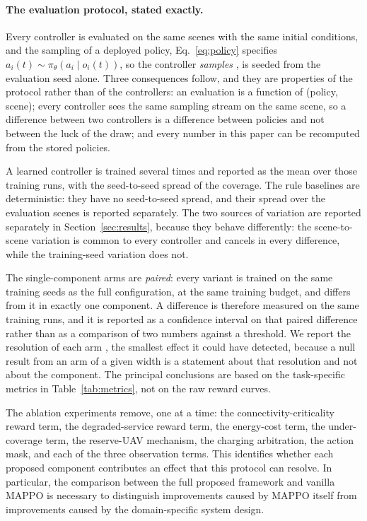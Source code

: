 \documentclass[conference]{IEEEtran}
\begin{document}
\paragraph{The evaluation protocol, stated exactly.} Every controller is
evaluated on the same scenes with the same initial conditions, and the
sampling of a deployed policy, Eq.~\eqref{eq:policy} specifies
$a_i(t)\sim\pi_\theta(a_i\mid o_i(t))$, so the controller \emph{samples} , 
is seeded from the evaluation seed alone. Three consequences follow, and
they are properties of the protocol rather than of the controllers: an
evaluation is a function of (policy, scene); every controller sees the
same sampling stream on the same scene, so a difference between two
controllers is a difference between policies and not between the luck of
the draw; and every number in this paper can be recomputed from the
stored policies.

A learned controller is trained several times and reported as the mean
over those training runs, with the seed-to-seed spread of the coverage.
The rule baselines are deterministic: they have no seed-to-seed spread,
and their spread over the evaluation scenes is reported separately. The
two sources of variation are reported separately in
Section~\ref{sec:results}, because they behave differently: the
scene-to-scene variation is common to every controller and cancels in
every difference, while the training-seed variation does not.

The single-component arms are \emph{paired}: every variant is trained on
the same training seeds as the full configuration, at the same training
budget, and differs from it in exactly one component. A difference is
therefore measured on the same training runs, and it is reported as a
confidence interval on that paired difference rather than as a comparison
of two numbers against a threshold. We report the resolution of each arm
,  the smallest effect it could have detected, because a null result
from an arm of a given width is a statement about that resolution and not
about the component. The principal conclusions are based on the
task-specific metrics in Table~\ref{tab:metrics}, not on the raw reward
curves.

The ablation experiments remove, one at a time: the connectivity-criticality reward term, the degraded-service reward term, the energy-cost term, the under-coverage term, the reserve-UAV mechanism, the charging arbitration, the action mask, and each of the three observation terms. This identifies whether each proposed component contributes an effect that this protocol can resolve. In particular, the comparison between the full proposed framework and vanilla MAPPO is necessary to distinguish improvements caused by MAPPO itself from improvements caused by the domain-specific system design.
\end{document}
